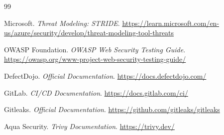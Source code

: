 \documentclass[11pt,a4paper,oneside]{report}
\begin{document}





\tableofcontents
\clearpage

























\begin{thebibliography}{99}


Microsoft.
\textit{Threat Modeling: STRIDE}.
\url{https://learn.microsoft.com/en-us/azure/security/develop/threat-modeling-tool-threats}

OWASP Foundation.
\textit{OWASP Web Security Testing Guide}.
\url{https://owasp.org/www-project-web-security-testing-guide/}

DefectDojo.
\textit{Official Documentation}.
\url{https://docs.defectdojo.com/}

GitLab.
\textit{CI/CD Documentation}.
\url{https://docs.gitlab.com/ci/}

Gitleaks.
\textit{Official Documentation}.
\url{https://github.com/gitleaks/gitleaks}

Aqua Security.
\textit{Trivy Documentation}.
\url{https://trivy.dev/}

\end{thebibliography}


\appendix


\end{document}
